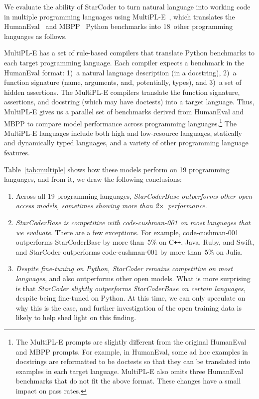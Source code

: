 We evaluate the ability of StarCoder to turn natural language into working code in multiple programming languages using MultiPL-E~\citep{cassano2022multiple}, which translates the HumanEval~\citep{chen2021codex} and MBPP~\citep{austin2021program} Python benchmarks into 18~other programming languages as follows. 

MultiPL-E has a set of rule-based compilers that translate Python benchmarks to each target programming language. Each compiler expects a benchmark in the HumanEval format:  1)~a natural language description (in a docstring), 2)~a function signature (name, arguments, and, potentially, types), and 3)~a set of hidden assertions. The MultiPL-E compilers translate the function signature, assertions, and docstring (which may have doctests) into a target language. Thus, MultiPL-E gives us a parallel set of benchmarks derived from HumanEval and MBPP to compare model performance across programming languages.\footnote{The MultiPL-E prompts are slightly different from the original HumanEval and MBPP prompts. For example, in HumanEval, some ad hoc examples in docstrings are reformatted to be doctests so that they can be translated into examples in each target language. MultiPL-E also omits three HumanEval benchmarks that do not fit the above format. These changes have a small impact on  pass rates.} The MultiPL-E languages include both high and low-resource languages, statically and dynamically typed languages, and  a variety of other programming language features.

Table~\ref{tab:multiple} shows how these models perform on 19 programming languages, and from it, we draw the following conclusions:

\begin{enumerate}

  \item Across all 19 programming languages, \emph{StarCoderBase outperforms other open-access models, sometimes showing more than 2$\times$~performance}.

  \item \emph{StarCoderBase is competitive with code-cushman-001 on most languages that we evaluate}. There are a few exceptions. For example, code-cushman-001 outperforms StarCoderBase by more than~5\% on C\texttt{++}, Java, Ruby, and Swift, and StarCoder outperforms code-cushman-001 by more than~5\% on Julia.

  \item \emph{Despite fine-tuning on Python, StarCoder remains competitive on most languages}, and also outperforms other open models. What is more surprising is that \emph{StarCoder slightly outperforms StarCoderBase on certain languages}, despite being fine-tuned on Python. At this time, we can only speculate on why this is the case, and further investigation of the open training data is likely to help shed light on this finding.

\end{enumerate}

